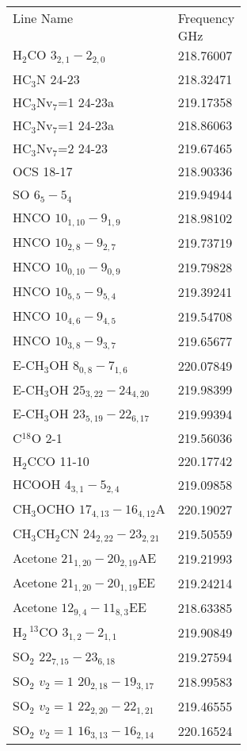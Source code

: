 \begin{table*}[htp]
\begin{minipage}[t]{0.5\textwidth}
\begin{tabular}{ll}
\label{tab:linesspw1}
Line Name & Frequency \\
 & $\mathrm{GHz}$ \\
\hline
H$_2$CO $3_{2,1}-2_{2,0}$ & 218.76007 \\
HC$_3$N 24-23 & 218.32471 \\
HC$_3$Nv$_7$=1 24-23a & 219.17358 \\
HC$_3$Nv$_7$=1 24-23a & 218.86063 \\
HC$_3$Nv$_7$=2 24-23 & 219.67465 \\
OCS 18-17 & 218.90336 \\
SO $6_5-5_4$ & 219.94944 \\
HNCO $10_{1,10}-9_{1,9}$ & 218.98102 \\
HNCO $10_{2,8}-9_{2,7}$ & 219.73719 \\
HNCO $10_{0,10}-9_{0,9}$ & 219.79828 \\
HNCO $10_{5,5}-9_{5,4}$ & 219.39241 \\
HNCO $10_{4,6}-9_{4,5}$ & 219.54708 \\
HNCO $10_{3,8}-9_{3,7}$ & 219.65677 \\
E-CH$_3$OH $8_{0,8}-7_{1,6}$ & 220.07849 \\
E-CH$_3$OH $25_{3,22}-24_{4,20}$ & 219.98399 \\
E-CH$_3$OH $23_{5,19}-22_{6,17}$ & 219.99394 \\
C$^{18}$O 2-1 & 219.56036 \\
H$_2$CCO 11-10 & 220.17742 \\
HCOOH $4_{3,1}-5_{2,4}$ & 219.09858 \\
CH$_3$OCHO $17_{4,13}-16_{4,12}$A & 220.19027 \\
CH$_3$CH$_2$CN $24_{2,22}-23_{2,21}$ & 219.50559 \\
Acetone $21_{1,20}-20_{2,19}$AE & 219.21993 \\
Acetone $21_{1,20}-20_{1,19}$EE & 219.24214 \\
Acetone $12_{9,4}-11_{8,3}$EE & 218.63385 \\
H$_2$\,$^{13}$CO $3_{1,2}-2_{1,1}$ & 219.90849 \\
SO$_2$ $22_{7,15}-23_{6,18}$ & 219.27594 \\
SO$_2$ $v_2=1$ $20_{2,18}-19_{3,17}$ & 218.99583 \\
SO$_2$ $v_2=1$ $22_{2,20}-22_{1,21}$ & 219.46555 \\
SO$_2$ $v_2=1$ $16_{3,13}-16_{2,14}$ & 220.16524 \\
\hline
\end{tabular}


\end{minipage}
\end{table*}
